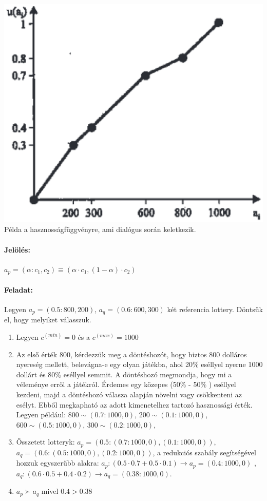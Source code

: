 \documentclass[a4paper,12pt]{article}
\begin{document}
\begin{center}

\includegraphics[scale=0.7]{utilmake}
\\
Példa a hasznosságfüggvényre, ami dialógus során keletkezik.
\end{center}

\paragraph{Jelölés: } $a_p = (\alpha: c_1, c_2) \equiv (\alpha \cdot c_1, (1-\alpha) \cdot c_2) $

\paragraph{Feladat: } Legyen $a_p = (0.5:800, 200)$, $a_q = (0.6:600, 300)$ két referencia lottery. Döntsük el, hogy melyiket válasszuk. 

\begin{enumerate}
\item Legyen $c^{(min)} = 0$ és a $c^{(max)} = 1000$
\item Az első érték 800, kérdezzük meg a döntéshozót, hogy biztos 800 dolláros nyereség mellett, belevágna-e egy olyan játékba, ahol 20$\%$ eséllyel nyerne 1000 dollárt és 80$\%$  eséllyel semmit. A döntéshozó megmondja, hogy mi a véleménye erről a játékról. Érdemes egy közepes (50$\%$ - 50$\%$ ) eséllyel kezdeni, majd a döntéshozó válasza alapján növelni vagy csökkenteni az esélyt. Ebből megkapható az adott kimenetelhez tartozó hasznossági érték. Legyen például: $800 \sim (0.7:1000, 0)$, $200 \sim (0.1:1000, 0)$, $600 \sim (0.5:1000, 0)$, $300 \sim (0.2:1000, 0)$,
  
\item Összetett lotteryk:  $a_p = (0.5:(0.7:1000, 0), (0.1:1000, 0))$, $a_q = (0.6:(0.5:1000, 0), (0.2:1000, 0))$, a redukciós szabály segítségével hozzuk egyszerűbb alakra: $a_p : (0.5\cdot 0.7+0.5\cdot 0.1) \rightarrow a_p=(0.4:1000, 0)$ , $a_q : (0.6\cdot 0.5+0.4\cdot 0.2) \rightarrow a_q = (0.38:1000, 0)$.
\item $a_p \succ a_q$ mivel $0.4 > 0.38$
\end{enumerate}
\end{document}
